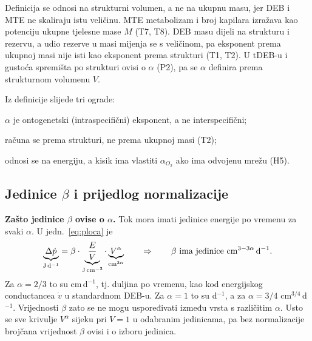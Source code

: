 Definicija se odnosi na strukturni volumen, a ne na ukupnu masu, jer DEB i MTE ne skaliraju istu veličinu. MTE metabolizam i broj kapilara izražava kao potenciju ukupne tjelesne mase $M$ (T7, T8). DEB masu dijeli na strukturu i rezervu, a udio rezerve u masi mijenja se s veličinom, pa eksponent prema ukupnoj masi nije isti kao eksponent prema strukturi (T1, T2). U tDEB-u i gustoća spremišta po strukturi ovisi o $\alpha$ (P2), pa se $\alpha$ definira prema strukturnom volumenu $V$.

Iz definicije slijede tri ograde:
\begin{enumerate*}[label=(\roman*)]
\item $\alpha$ je ontogenetski (intraspecifični) eksponent, a ne interspecifični;
\item računa se prema strukturi, ne prema ukupnoj masi (T2);
\item odnosi se na energiju, a kisik ima vlastiti $\alpha_{O_2}$ ako ima odvojenu mrežu (H5).
\end{enumerate*}

\subsection{Jedinice $\beta$ i prijedlog normalizacije}\label{sec:normalizacija}

\textbf{Zašto jedinice $\beta$ ovise o $\alpha$.} Tok mora imati jedinice energije po vremenu za svaki $\alpha$. U jedn.~\eqref{eq:ploca} je
\[
\underbrace{\Delta\dot{p}}_{\mathrm{J\,d^{-1}}}=\beta\cdot\underbrace{\frac{E}{V}}_{\mathrm{J\,cm^{-3}}}\cdot\underbrace{V^{\alpha}}_{\mathrm{cm^{3\alpha}}}
\qquad\Rightarrow\qquad
\beta\ \text{ima jedinice}\ \mathrm{cm^{3-3\alpha}\,d^{-1}} .
\]
Za $\alpha=2/3$ to su cm\,d$^{-1}$, tj. duljina po vremenu, kao kod energijskog conductancea $\dot v$ u standardnom DEB-u. Za $\alpha=1$ to su d$^{-1}$, a za $\alpha=3/4$ cm$^{3/4}$\,d$^{-1}$. Vrijednosti $\beta$ zato se ne mogu uspoređivati između vrsta s različitim $\alpha$. Usto se sve krivulje $V^{\alpha}$ sijeku pri $V=1$ u odabranim jedinicama, pa bez normalizacije brojčana vrijednost $\beta$ ovisi i o izboru jedinica.

